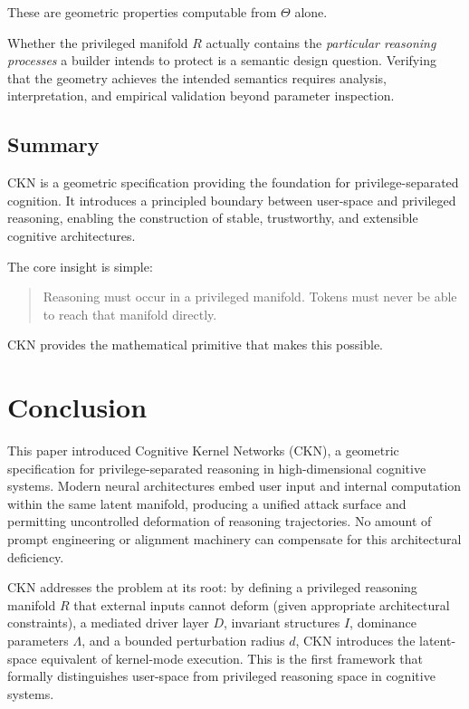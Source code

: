 \documentclass[11pt,a4paper]{article}
\begin{document}
These are geometric properties computable from $\Theta$ alone.

Whether the privileged manifold $R$ actually contains the \emph{particular reasoning processes} a builder intends to protect is a semantic design question. Verifying that the geometry achieves the intended semantics requires analysis, interpretation, and empirical validation beyond parameter inspection.

\subsection{Summary}

CKN is a geometric specification providing the foundation for privilege-separated cognition. It introduces a principled boundary between user-space and privileged reasoning, enabling the construction of stable, trustworthy, and extensible cognitive architectures.

The core insight is simple:
\begin{quote}
Reasoning must occur in a privileged manifold. Tokens must never be able to reach that manifold directly.
\end{quote}

CKN provides the mathematical primitive that makes this possible.

\section{Conclusion}

This paper introduced Cognitive Kernel Networks (CKN), a geometric specification for privilege-separated reasoning in high-dimensional cognitive systems. Modern neural architectures embed user input and internal computation within the same latent manifold, producing a unified attack surface and permitting uncontrolled deformation of reasoning trajectories. No amount of prompt engineering or alignment machinery can compensate for this architectural deficiency.

CKN addresses the problem at its root: by defining a privileged reasoning manifold $R$ that external inputs cannot deform (given appropriate architectural constraints), a mediated driver layer $D$, invariant structures $I$, dominance parameters $\Lambda$, and a bounded perturbation radius $d$, CKN introduces the latent-space equivalent of kernel-mode execution. This is the first framework that formally distinguishes user-space from privileged reasoning space in cognitive systems.
\end{document}
